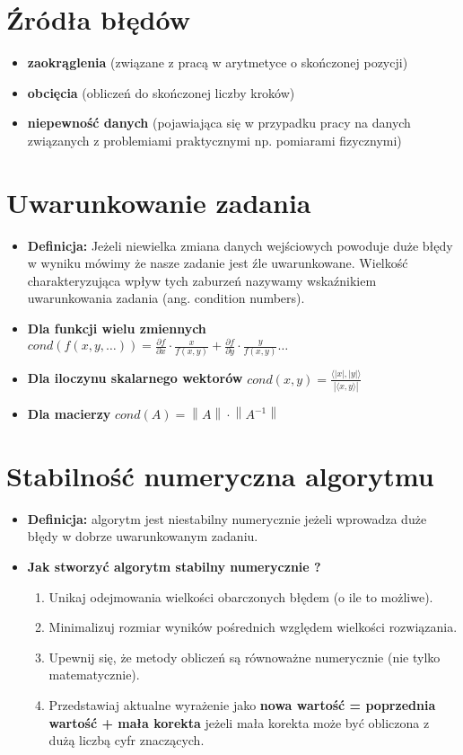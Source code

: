 \documentclass[11pt]{article}
\newcommand{\norm}[1]{\left\lVert#1\right\rVert}
\begin{document}
\section{Źródła błędów}
\begin{itemize}
    \item \textbf{zaokrąglenia} (związane z pracą w arytmetyce o skończonej pozycji)
    \item \textbf{obcięcia} (obliczeń do skończonej liczby kroków)
    \item \textbf{niepewność danych} (pojawiająca się w przypadku pracy na danych związanych z problemiami praktycznymi np. pomiarami fizycznymi)
\end{itemize}

\section{Uwarunkowanie zadania}
\begin{itemize}
    \item \textbf{Definicja: }Jeżeli niewielka zmiana danych wejściowych powoduje duże błędy w wyniku mówimy że nasze zadanie jest źle uwarunkowane. Wielkość charakteryzująca wpływ tych zaburzeń nazywamy wskaźnikiem uwarunkowania zadania (ang. condition numbers). 
    \item \textbf{Dla funkcji wielu zmiennych} $cond(f(x,y,\dots)) = \frac{\partial f}{\partial x} \cdot \frac{x}{f(x,y)} + \frac{\partial f}{\partial y} \cdot \frac{y}{f(x,y)}\dots$
    \item \textbf{Dla iloczynu skalarnego wektorów} $cond(x,y) = \frac{\langle |x|, |y| \rangle}{|\langle x, y \rangle|}$
    \item \textbf{Dla macierzy} $cond(A) = \norm{A} \cdot \norm{A^{-1}}$
\end{itemize}

\section{Stabilność numeryczna algorytmu}
\begin{itemize}
    \item \textbf{Definicja: }algorytm jest niestabilny numerycznie jeżeli wprowadza duże błędy w dobrze uwarunkowanym zadaniu.
    \item \textbf{Jak stworzyć algorytm stabilny numerycznie ?}
    \begin{enumerate}
        \item Unikaj odejmowania wielkości obarczonych błędem (o ile to możliwe).
        \item Minimalizuj rozmiar wyników pośrednich względem wielkości rozwiązania.
        \item Upewnij się, że metody obliczeń są równoważne numerycznie (nie tylko matematycznie).
        \item Przedstawiaj aktualne wyrażenie jako \textbf{nowa wartość = poprzednia wartość + mała korekta} jeżeli mała korekta może być obliczona z dużą liczbą cyfr znaczących.
    \end{enumerate}
\end{itemize}
\end{document}
